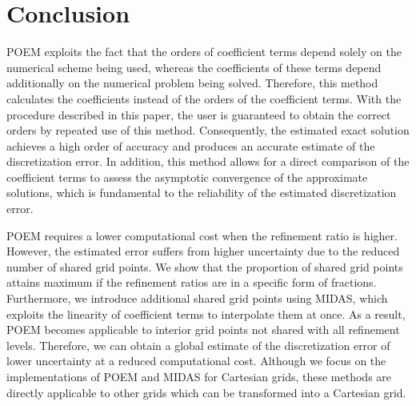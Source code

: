 \section{Conclusion}
POEM exploits the fact that the orders of coefficient terms depend solely on the numerical scheme being used, whereas the coefficients of these terms depend additionally on the numerical problem being solved. Therefore, this method calculates the coefficients instead of the orders of the coefficient terms. With the procedure described in this paper, the user is guaranteed to obtain the correct orders by repeated use of this method. Consequently, the estimated exact solution achieves a high order of accuracy and produces an accurate estimate of the discretization error. In addition, this method allows for a direct comparison of the coefficient terms to assess the asymptotic convergence of the approximate solutions, which is fundamental to the reliability of the estimated discretization error.

POEM requires a lower computational cost when the refinement ratio is higher. However, the estimated error suffers from higher uncertainty due to the reduced number of shared grid points. We show that the proportion of shared grid points attains maximum if the refinement ratios are in a specific form of fractions. Furthermore, we introduce additional shared grid points using MIDAS, which exploits the linearity of coefficient terms to interpolate them at once. As a result, POEM becomes applicable to interior grid points not shared with all refinement levels. Therefore, we can obtain a global estimate of the discretization error of lower uncertainty at a reduced computational cost. Although we focus on the implementations of POEM and MIDAS for Cartesian grids, these methods are directly applicable to other grids which can be transformed into a Cartesian grid.

